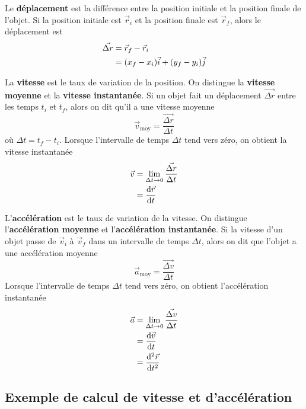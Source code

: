 Le \textbf{déplacement} est la différence entre la position initiale et la
position finale de l'objet.  Si la position initiale est $\vec{r}_i$ et la
position finale est $\vec{r}_f$, alors le déplacement est
\begin{align*}
  \vec{\Delta r} &= \vec{r}_f - \vec{r}_i \\
                 &= (x_f - x_i) \vec{i} + (y_f - y_i) \vec{j}
\end{align*}

La \textbf{vitesse} est le taux de variation de la position.  On distingue la
\textbf{vitesse moyenne} et la \textbf{vitesse instantanée}.  Si un objet fait
un déplacement $\vec{\Delta r}$ entre les temps $t_i$ et $t_f$, alors on dit qu'il a
une vitesse moyenne
\[
  \vec{v}_{\mathrm{moy}} = \frac{\vec{\Delta r}}{\Delta t}
\]
où $\Delta t = t_f - t_i$.  Lorsque l'intervalle de temps $\Delta t$ tend vers
zéro, on obtient la vitesse instantanée
\begin{align*}
  \vec{v} &= \lim_{\Delta t \rightarrow 0} \frac{\vec{\Delta r}}{\Delta t} \\
          &= \frac{\mathrm{d}\vec{r}}{\mathrm{d}t}
\end{align*}

L'\textbf{accélération} est le taux de variation de la vitesse.  On distingue
l'\textbf{accélération moyenne} et l'\textbf{accélération instantanée}.  Si la
vitesse d'un objet passe de $\vec{v}_i$ à $\vec{v}_f$ dans un intervalle de
temps $\Delta t$, alors on dit que l'objet a une accélération moyenne
\[
  \vec{a}_{\mathrm{moy}} = \frac{\vec{\Delta v}}{\Delta t}
\]
Lorsque l'intervalle de temps $\Delta t$ tend vers zéro, on obtient
l'accélération instantanée
\begin{align*}
  \vec{a} &= \lim_{\Delta t \rightarrow 0} \frac{\vec{\Delta v}}{\Delta t} \\
          &= \frac{\mathrm{d}\vec{v}}{\mathrm{d}t} \\
          &= \frac{\mathrm{d}{}^2\vec{r}}{\mathrm{d}t^2}
\end{align*}


\subsection{Exemple de calcul de vitesse et d'accélération}

